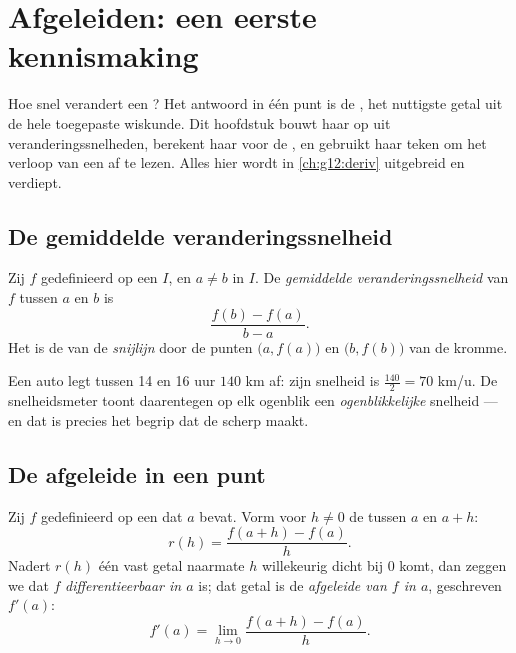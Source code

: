 \chapter{Afgeleiden: een eerste kennismaking}\label{ch:g11:deriv}

Hoe snel verandert een ? Het antwoord in één punt is de
\emph{}, het nuttigste getal uit de hele toegepaste wiskunde. Dit
hoofdstuk bouwt haar op uit  veranderingssnelheden, berekent haar
voor de , en gebruikt haar teken om het verloop van een
 af te lezen. Alles hier wordt in \cref{ch:g12:deriv} uitgebreid en
verdiept.

\section{De gemiddelde veranderingssnelheid}

\begin{definition}\label{def:g11:deriv:rate}
Zij $f$ gedefinieerd op een  $I$, en $a \neq b$ in $I$. De
\emph{gemiddelde veranderingssnelheid} van $f$ tussen $a$ en $b$ is
\[
\frac{f(b) - f(a)}{b - a}.
\]
Het is de  van de \emph{snijlijn} door de
punten $\bigl(a, f(a)\bigr)$ en $\bigl(b, f(b)\bigr)$ van de kromme.
\end{definition}

\begin{example}
Een auto legt tussen 14 en 16 uur $140$ km af: zijn  snelheid is
$\frac{140}{2} = 70$ km/u. De snelheidsmeter toont daarentegen op elk
ogenblik een \emph{ogenblikkelijke} snelheid --- en dat is precies het begrip
dat de  scherp maakt.
\end{example}

\section{De afgeleide in een punt}

\begin{definition}\label{def:g11:deriv:derivative}
Zij $f$ gedefinieerd op een  dat $a$ bevat. Vorm voor $h \neq 0$ de
 tussen $a$ en $a + h$:
\[
r(h) = \frac{f(a+h) - f(a)}{h}.
\]
Nadert $r(h)$ één vast getal naarmate $h$ willekeurig dicht bij $0$ komt, dan
zeggen we dat $f$ \emph{differentieerbaar in $a$}
is; dat getal is de \emph{afgeleide van $f$ in $a$}, geschreven $f'(a)$:
\[
f'(a) = \lim_{h \to 0} \frac{f(a+h) - f(a)}{h}.
\]
\end{definition}

